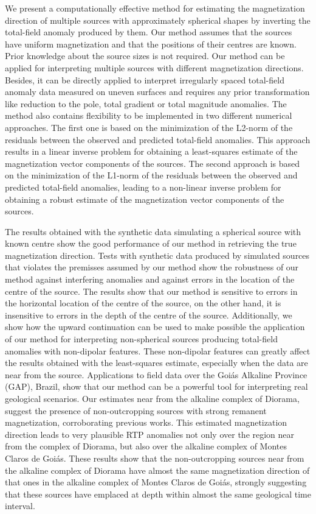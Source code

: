 \documentclass[journal abbreviation, npg]{copernicus}
\begin{document}
We present a computationally effective method for estimating the magnetization direction of multiple sources with approximately spherical shapes by inverting the total-field anomaly produced by them. Our method assumes that the sources have uniform magnetization and that the positions of their centres are known. Prior knowledge about the source sizes is not required. Our method can be applied for interpreting multiple sources with different magnetization directions. Besides, it can be directly applied to interpret irregularly spaced total-field anomaly data measured on uneven surfaces and requires any prior transformation like reduction to the pole, total gradient or total magnitude anomalies. The method also contains flexibility to be implemented in two different numerical approaches. The first one is based on the minimization of the L2-norm of the residuals between the observed and predicted total-field anomalies. This approach results in a linear inverse problem for obtaining a least-squares estimate of the magnetization vector components of the sources. The second approach is based on the minimization of the L1-norm of the residuals between the observed and predicted total-field anomalies, leading to a non-linear inverse problem for obtaining a robust estimate of the magnetization vector components of the sources.

The results obtained with the synthetic data simulating a spherical source with known centre show the good performance of our method in retrieving the true magnetization direction. Tests with synthetic data produced by simulated sources that violates the premisses assumed by our method show the robustness of our method against interfering anomalies and against errors in the location of the centre of the source. The results show that our method is sensitive to errors in the horizontal location of the centre of the source, on the other hand, it is insensitive to errors in the depth of the centre of the source. Additionally, we show how the upward continuation can be used to make possible the application of our method for interpreting non-spherical sources producing total-field anomalies with non-dipolar features. These non-dipolar features can greatly affect the results obtained with the least-squares estimate, especially when the data are near from the source. Applications to field data over the Goiás Alkaline Province (GAP), Brazil, show that our method can be a powerful tool for interpreting real geological scenarios. Our estimates near from the alkaline complex of Diorama, suggest the presence of non-outcropping sources with strong remanent magnetization, corroborating previous works. This estimated magnetization direction leads to very plausible RTP anomalies not only over the region near from the complex of Diorama, but also over the alkaline complex of Montes Claros de Goiás. These results show that the non-outcropping sources near from the alkaline complex of Diorama have almost the same magnetization direction of that ones in the alkaline complex of Montes Claros de Goiás, strongly suggesting that these sources have emplaced at depth within almost the same geological time interval. 
\end{document}

